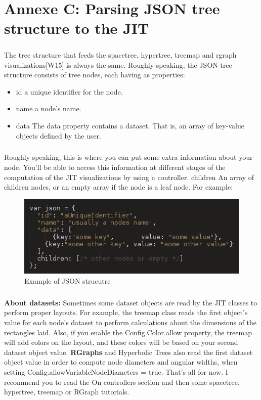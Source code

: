 \chapter{Annexe C: Parsing JSON tree structure to the JIT}
\paragraph*{}
The tree structure that feeds the spacetree, hypertree, treemap and rgraph visualizations[W15] is always the same. Roughly speaking, the JSON tree structure consists of tree nodes, each having as properties:
\begin{itemize}
\item id a unique identifier for the node.
\item name a node's name.
\item data The data property contains a dataset. That is, an array of key-value objects defined by the user.
\end{itemize}
\paragraph*{}
Roughly speaking, this is where you can put some extra information about your node. You'll be able to access this information at different stages of the computation of the JIT visualizations by using a controller.
children An array of children nodes, or an empty array if the node is a leaf node. For example:
\begin{center}
\begin{figure}
\includegraphics[scale=0.5]{example1.png}
\caption{Example of JSON strucutre}
\end{figure}
\end{center}
\paragraph*{}
\textbf{About datasets:} Sometimes some dataset objects are read by the JIT classes to perform proper layouts. For example, the treemap class reads the first object's value for each node's dataset to perform calculations about the dimensions of the rectangles laid. Also, if you enable the Config.Color.allow property, the treemap will add colors on the layout, and these colors will be based on your second dataset object value. \textbf{RGraphs} and Hyperbolic Trees also read the first dataset object value in order to compute node diameters and angular widths, when setting Config.allowVariableNodeDiameters = true. That's all for now. I recommend you to read the On controllers section and then some spacetree, hypertree, treemap or RGraph tutorials.
